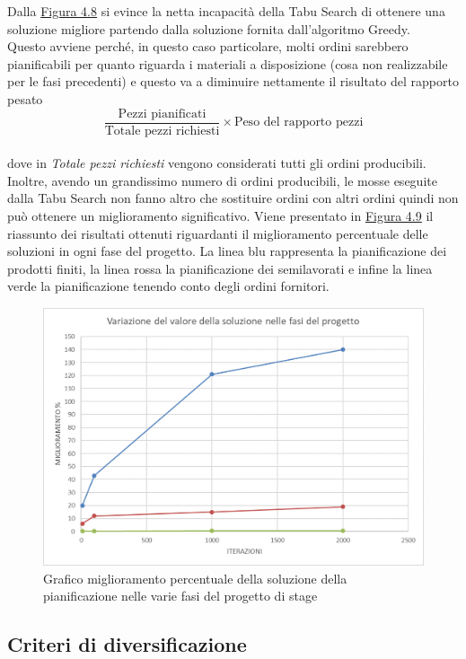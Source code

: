 Dalla \hyperref[4.8]{Figura 4.8} si evince la netta incapacità della Tabu Search di ottenere una soluzione migliore partendo dalla soluzione fornita dall'algoritmo Greedy.\\
Questo avviene perché, in questo caso particolare, molti ordini sarebbero pianificabili per quanto riguarda i materiali a disposizione (cosa non realizzabile per le fasi
precedenti) e questo va a diminuire nettamente il risultato del rapporto pesato \[\frac{\text{Pezzi pianificati}}{\text{Totale pezzi richiesti}} \times \text{Peso del rapporto pezzi}\]\\
dove in \textit{Totale pezzi richiesti} vengono considerati tutti gli ordini producibili.\\ Inoltre, avendo un grandissimo numero di ordini producibili, le mosse eseguite 
dalla Tabu Search non fanno altro che sostituire ordini con altri ordini quindi non può ottenere un miglioramento significativo. Viene presentato in \hyperref[4.9]{Figura 4.9} 
il riassunto dei risultati ottenuti riguardanti il miglioramento percentuale delle soluzioni in ogni fase del progetto. La linea blu rappresenta la pianificazione dei prodotti finiti,
 la linea rossa la pianificazione dei semilavorati e infine la linea verde la pianificazione tenendo conto degli ordini fornitori. 

\begin{figure}[H]
	\includegraphics[width=13cm]{immagini/graficofi.png}
	\centering
    \caption{Grafico miglioramento percentuale della soluzione della pianificazione nelle varie fasi del progetto di stage}
    \label{4.9}
\end{figure}


\subsection{Criteri di diversificazione}


